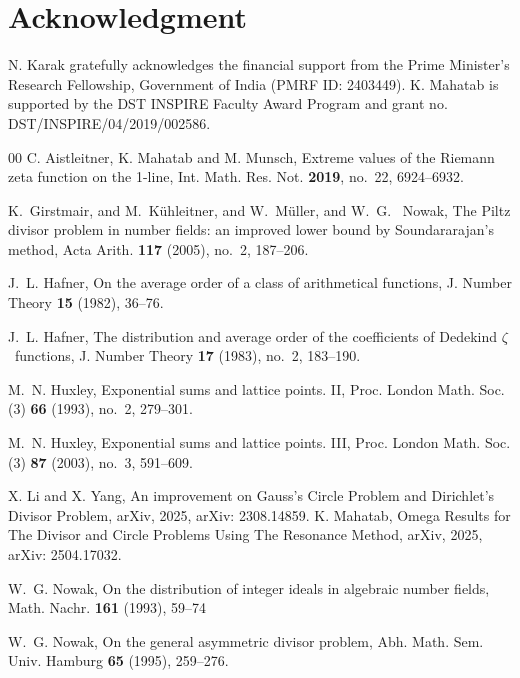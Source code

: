 \documentclass[reqno]{amsart}
\numberwithin{equation}{section}
\theoremstyle{plain}
\begin{document}
	\section*{Acknowledgment}  
N. Karak gratefully acknowledges the financial support from the Prime Minister's Research Fellowship, Government of India (PMRF ID: 2403449). K. Mahatab is supported by the DST INSPIRE
Faculty Award Program and grant no. DST/INSPIRE/04/2019/002586.
	
	\begin{thebibliography}{00}
		 C. Aistleitner, K. Mahatab and M. Munsch, {Extreme values of the Riemann zeta function on the 1-line}, Int. Math. Res. Not. {\bf 2019}, no.~22, 6924--6932.
		
		 K.~Girstmair,  and M.~K\"uhleitner,  and W.~M\"uller, and W.~G.~ Nowak,
		 The Piltz divisor problem in number fields: an improved lower bound by Soundararajan's method, Acta Arith. {\bf 117} (2005), no.~2, 187--206.
		
		 J.~L. Hafner, {On the average order of a class of arithmetical functions}, J. Number Theory {\bf 15} (1982),  36--76.
		
		 J.~L. Hafner, The distribution and average order of the coefficients of Dedekind $\zeta $\ functions, J. Number Theory {\bf 17} (1983), no.~2, 183--190.
		
		 M.~N. Huxley, Exponential sums and lattice points. II, Proc. London Math. Soc. (3) {\bf 66} (1993), no.~2, 279--301.
		
		 M.~N. Huxley, Exponential sums and lattice points. III, Proc. London Math. Soc. (3) {\bf 87} (2003), no.~3, 591--609.
		
		 X. Li and X. Yang, {An improvement on Gauss's Circle Problem and Dirichlet's Divisor Problem},
		arXiv, 2025, arXiv: 2308.14859.
		 K. Mahatab, {Omega Results for The Divisor and Circle Problems Using The Resonance Method}, arXiv, 2025, arXiv: 2504.17032.
	
        W.~G. Nowak, On the distribution of integer ideals in algebraic number fields, Math. Nachr. {\bf 161} (1993), 59--74
      
       W.~G. Nowak, On the general asymmetric divisor problem, Abh. Math. Sem. Univ. Hamburg {\bf 65} (1995), 259--276.
	
		

\end{thebibliography}
\end{document}
